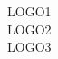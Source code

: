 \thispagestyle{empty}
\noindent\textsf{\blindtext}
\vspace{.7cm}

\begin{center}
	\avantgarLarge LOGO1\\[1ex]
	\avantgarLarge LOGO2\\[1ex]
	\avantgarLarge LOGO3
\end{center}

\vspace{.7cm}
\noindent\textsf{\blindtext}
